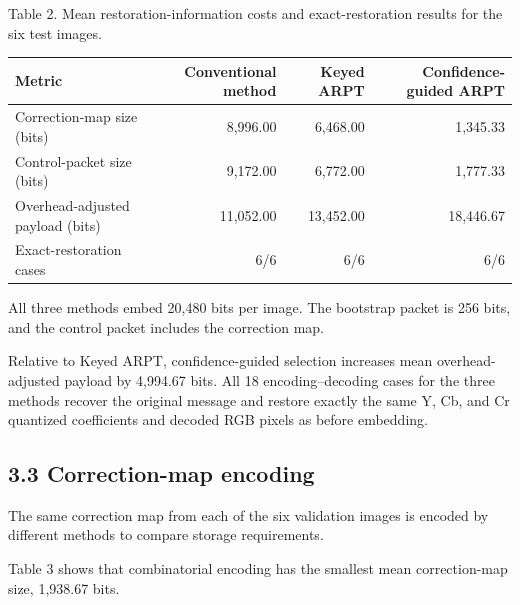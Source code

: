 \documentclass[
  11pt,
  a4paper,
]{article}
\newcounter{none} %
\begin{document}
\begin{minipage}{\linewidth}
Table 2. Mean restoration-information costs and exact-restoration
results for the six test images.

{\def\LTcaptype{none} %
\begin{longtable}[]{@{}lrrr@{}}
\toprule\noalign{}
Metric & Conventional method & Keyed ARPT & Confidence-guided ARPT \\
\midrule\noalign{}
\endhead
\bottomrule\noalign{}
\endlastfoot
Correction-map size (bits) & 8,996.00 & 6,468.00 & 1,345.33 \\
Control-packet size (bits) & 9,172.00 & 6,772.00 & 1,777.33 \\
Overhead-adjusted payload (bits) & 11,052.00 & 13,452.00 & 18,446.67 \\
Exact-restoration cases & 6/6 & 6/6 & 6/6 \\
\end{longtable}
}
\end{minipage}

All three methods embed 20,480 bits per image. The bootstrap packet is
256 bits, and the control packet includes the correction map.

Relative to Keyed ARPT, confidence-guided selection increases mean
overhead-adjusted payload by 4,994.67 bits. All 18 encoding--decoding
cases for the three methods recover the original message and restore
exactly the same Y, Cb, and Cr quantized coefficients and decoded RGB
pixels as before embedding.

\subsection*{3.3 Correction-map encoding}\label{correction-map-encoding}

The same correction map from each of the six validation images is
encoded by different methods to compare storage requirements.

Table 3 shows that combinatorial encoding has the smallest mean
correction-map size, 1,938.67 bits.
\end{document}
